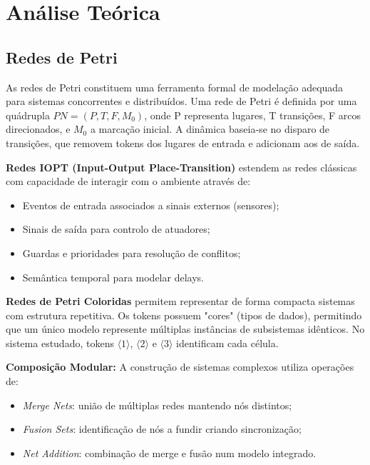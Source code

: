 \section{Análise Teórica}

\subsection{Redes de Petri}

As redes de Petri constituem uma ferramenta formal de modelação adequada para sistemas concorrentes e distribuídos. Uma rede de Petri é definida por uma quádrupla $PN = (P, T, F, M_0)$, onde P representa lugares, T transições, F arcos direcionados, e $M_0$ a marcação inicial. A dinâmica baseia-se no disparo de transições, que removem tokens dos lugares de entrada e adicionam aos de saída.

\textbf{Redes IOPT (Input-Output Place-Transition)} estendem as redes clássicas com capacidade de interagir com o ambiente através de:
\begin{itemize}
    \item Eventos de entrada associados a sinais externos (sensores);
    \item Sinais de saída para controlo de atuadores;
    \item Guardas e prioridades para resolução de conflitos;
    \item Semântica temporal para modelar delays.
\end{itemize}

\textbf{Redes de Petri Coloridas} permitem representar de forma compacta sistemas com estrutura repetitiva. Os tokens possuem "cores" (tipos de dados), permitindo que um único modelo represente múltiplas instâncias de subsistemas idênticos. No sistema estudado, tokens $\langle 1 \rangle$, $\langle 2 \rangle$ e $\langle 3 \rangle$ identificam cada célula.

\textbf{Composição Modular:} A construção de sistemas complexos utiliza operações de:
\begin{itemize}
    \item \textit{Merge Nets}: união de múltiplas redes mantendo nós distintos;
    \item \textit{Fusion Sets}: identificação de nós a fundir criando sincronização;
    \item \textit{Net Addition}: combinação de merge e fusão num modelo integrado.
\end{itemize}

